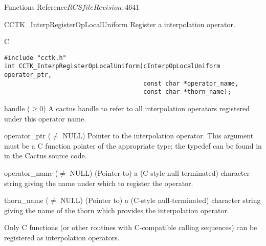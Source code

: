 \begin{cactuspart}{ Functions Reference}{$RCSfile$}{$Revision: 4641 $}


\begin{FunctionDescription}{CCTK\_InterpRegisterOpLocalUniform}
\label{CCTK-InterpRegisterOpLocalUniform}
Register a  interpolation operator.

\begin{SynopsisSection}
\begin{Synopsis}{C}
\begin{verbatim}
#include "cctk.h"
int CCTK_InterpRegisterOpLocalUniform(cInterpOpLocalUniform operator_ptr,
                                      const char *operator_name,
                                      const char *thorn_name);
\end{verbatim}
\end{Synopsis}
\end{SynopsisSection}

\begin{ResultSection}
\begin{Result}{handle ($\ge 0$)}
A cactus handle to refer to all interpolation operators registered
under this operator name.
\end{Result}
\end{ResultSection}

\begin{ParameterSection}
\begin{Parameter}{operator\_ptr ($\ne$ NULL)}
\hbox{}
Pointer to the  interpolation operator.
This argument must be a C function pointer of the appropriate type;
the typedef can be found in  in the
Cactus source code.
\end{Parameter}
\begin{Parameter}{operator\_name ($\ne$ NULL)}
\hbox{}
(Pointer to) a (C-style null-terminated) character string giving
the name under which to register the operator.
\end{Parameter}
\begin{Parameter}{thorn\_name ($\ne$ NULL)}
\hbox{}
(Pointer to) a (C-style null-terminated) character string giving
the name of the thorn which provides the interpolation operator.
\end{Parameter}
\end{ParameterSection}

\begin{Discussion}
Only C functions (or other routines with C-compatible calling sequences)
can be registered as interpolation operators.
\end{Discussion}


\end{FunctionDescription}
\end{cactuspart}

